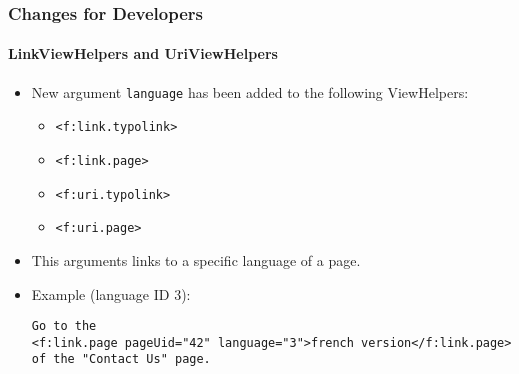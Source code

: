 
\begin{frame}[fragile]
	\frametitle{Changes for Developers}
	\framesubtitle{LinkViewHelpers and UriViewHelpers}

	\lstset{basicstyle=\tiny\ttfamily}

	\begin{itemize}
		\item New argument \texttt{language} has been added to the following ViewHelpers:
			\begin{itemize}
				\item \texttt{<f:link.typolink>}
				\item \texttt{<f:link.page>}
				\item \texttt{<f:uri.typolink>}
				\item \texttt{<f:uri.page>}
			\end{itemize}

		\item This arguments links to a specific language of a page.
		\item Example (language ID 3):
\begin{lstlisting}
Go to the
<f:link.page pageUid="42" language="3">french version</f:link.page>
of the "Contact Us" page.
\end{lstlisting}

	\end{itemize}

\end{frame}


